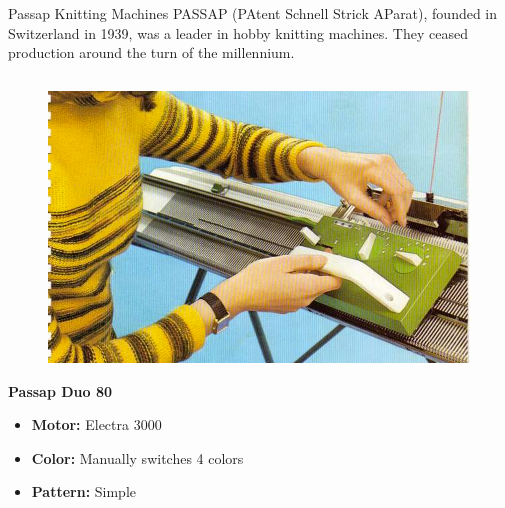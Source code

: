 \documentclass[
    NAME={Dr. Helga Ingimundardóttir},
    EMAIL={helgaingim@hi.is},
    FACULTY={Industrial Engineering},
    TITLE={HiDef Textiles: Reviving Tradition with Innovation},
    SUBTITLE={Empowering Creativity and Sustainability in Textile Production through Digital Transformation},
    SEMINAR={Reykjavík DataBeers},
    DATE={January 25, 2025},
    WIDE={true}
]{HI-LaTeX/hi-beamer}
\begin{document}
\begin{frame}{Passap Knitting Machines}
PASSAP (PAtent Schnell Strick AParat), founded in Switzerland in 1939, was a leader in hobby knitting machines. They ceased production around the turn of the millennium.

\begin{columns}

\begin{column}{0.45\textwidth}
    \begin{figure}\includegraphics[height=0.3\textheight]{include/duo80.png}
    \end{figure}
    \textbf{Passap Duo 80}
    \begin{itemize}
        \item \textbf{Motor:} Electra 3000
        \item \textbf{Color:} Manually switches 4 colors
        \item \textbf{Pattern:} Simple
    \end{itemize}
\end{column}


\end{columns}
\end{frame}
\end{document}
